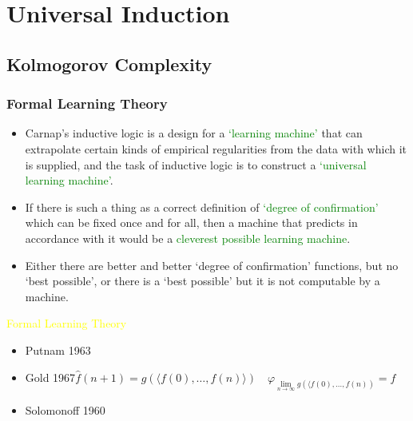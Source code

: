 \documentclass[UTF8,11pt,colorlinks,compress,openany]{beamer}%
\begin{document}
\section{Universal Induction}

\subsection{Kolmogorov Complexity}

\begin{frame}\frametitle{Formal Learning Theory}
\begin{itemize}
	\item Carnap's inductive logic is a design for a \textcolor{green}{`learning machine'} that can extrapolate certain kinds of empirical regularities from the data with which it is supplied, and the task of inductive logic is to construct a \textcolor{green}{`universal learning machine'}.
	\item If there is such a thing as a correct definition of \textcolor{green}{`degree of confirmation'} which can be fixed once and for all, then a machine that predicts in accordance with it would be a \textcolor{green}{cleverest possible learning machine}.
	\item Either there are better and better `degree of confirmation' functions, but no `best possible', or there is a `best possible' but it is not computable by a machine.
\end{itemize}
\textcolor{yellow}{Formal Learning Theory}
\begin{itemize}
	\item Putnam 1963
	\item Gold 1967\quad $\hat{f}(n+1)=g(\langle f(0),\ldots,f(n)\rangle)\quad\varphi_{\lim\limits_{n\to\infty}g(\langle f(0),\dots,f(n))}=f$
	\item Solomonoff 1960
\end{itemize}
\end{frame}
\end{document}

